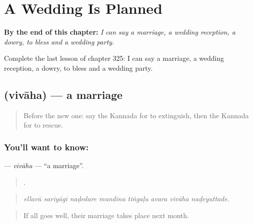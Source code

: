 
\chapter{A Wedding Is Planned}
\label{ch:ka-a-wedding-is-planned}

\begin{chapteropening}
\textbf{By the end of this chapter:} \emph{I can say a marriage, a wedding reception, a dowry, to bless and a wedding party.}

Complete the last lesson of chapter 325: I can say a marriage, a wedding reception, a dowry, to bless and a wedding party.
\end{chapteropening}

\section[\texorpdfstring{\kn{ವಿವಾಹ} (vivāha)}{ವಿವಾಹ (vivāha)}]{ (vivāha) — a marriage}

\label{lesson:KA-C325-vivaha}



\begin{quote}
Before the new one: say the Kannada for to extinguish, then the Kannada for to rescue.
\end{quote}

\subsection*{You'll want to know: }
\textbf{} — \emph{vivāha} — \textquotedblleft{}a marriage\textquotedblright{}.

\begin{quote}
       .
\end{quote}

\begin{quote}
\emph{ellavū sariyāgi naḍedare mundina tiṅgaḷu avara vivāha naḍeyuttade.}
\end{quote}

\begin{quote}
If all goes well, their marriage takes place next month.
\end{quote}

